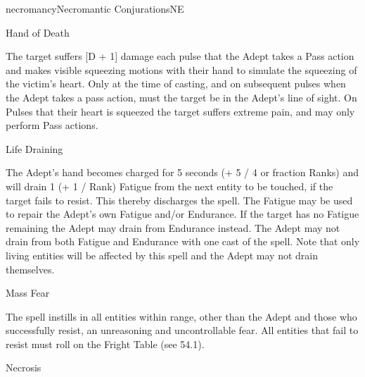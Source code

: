\begin{College}[1.1]{necromancy}{Necromantic Conjurations}{NE}
\begin{spell}[S-6]{Hand of Death}

\begin{effects}
The target suffers [D + 1] damage each pulse that the Adept takes a
Pass action and makes visible squeezing motions with their hand to
simulate the squeezing of the victim’s heart. Only at the time of
casting, and on subsequent pulses when the Adept takes a pass action,
must the target be in the Adept’s line of sight.  On Pulses that their
heart is squeezed the target suffers extreme pain, and may only
perform Pass actions.
\end{effects}
\end{spell}

\begin{spell}[S-7]{Life Draining}

\begin{effects}
The Adept’s hand becomes charged for 5 seconds (+ 5 / 4 or fraction
Ranks) and will drain 1 (+ 1 / Rank) Fatigue from the next entity to
be touched, if the target fails to resist.  This thereby discharges
the spell.  The Fatigue may be used to repair the Adept’s own Fatigue
and/or Endurance.  If the target has no Fatigue remaining the Adept
may drain from Endurance instead. The Adept may not drain from both
Fatigue and Endurance with one cast of the spell. Note that only
living entities will be affected by this spell and the Adept may not
drain themselves.
\end{effects}
\end{spell}

\begin{spell}[S-8]{Mass Fear}

\begin{effects}
The spell instills in all entities within range, other than the Adept
and those who successfully resist, an unreasoning and uncontrollable
fear.  All entities that fail to resist must roll on the Fright Table
(see 54.1).
\end{effects}
\end{spell}

\begin{spell}[S-9]{Necrosis}


\end{spell}
\end{College}
